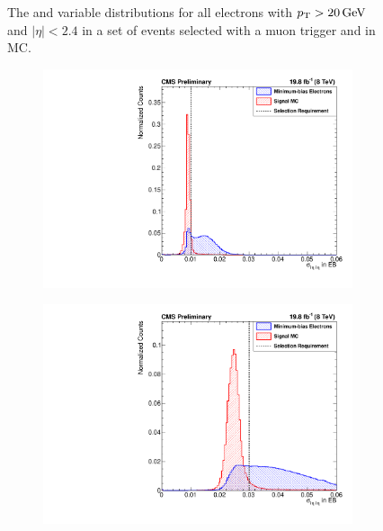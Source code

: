 \begin{figure}[!htbp]
\begin{subfigure}[b]{\StackedPlotWidth}
        \caption{}
        \label{fig:ooeoop}
    \end{subfigure}
    \caption[
        Distributions of \HOverE and \ooeoop in data and MC.
    ]{
        The \HOverE and \ooeoop variable distributions for all electrons with
        $p_{\mathrm{T}} > 20 \,\text{Ge\hspace{-.08em}V}$ and $|\eta| < 2.4$ in a set of events selected with a
        muon trigger and in \MADGRAPH \Ztoee MC.
    }
    \label{fig:he_ooeoop}
\end{figure}

\begin{figure}[!htbp]
    \centering
    \begin{subfigure}[b]{\StackedPlotWidth}
        \includegraphics[width=\textwidth]{figures/e_reco_var_sigma_ieta_ieta_eb.pdf}
        \caption{}
        \label{fig:sieie_eb}
    \end{subfigure}
    \begin{subfigure}[b]{\StackedPlotWidth}
        \includegraphics[width=\textwidth]{figures/e_reco_var_sigma_ieta_ieta_ee.pdf}

\end{subfigure}
\end{figure}
